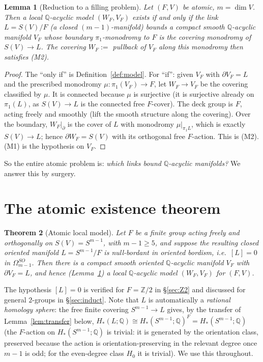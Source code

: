 \documentclass[12pt]{article}
\newtheorem{theorem}{Theorem}
\newtheorem{lemma}[theorem]{Lemma}
\theoremstyle{definition}
\begin{document}
\begin{lemma}[Reduction to a filling problem]\label{lem:reduce}
Let $(F,V)$ be atomic, $m=\dim V$. Then a local $\mathbb{Q}$-acyclic model
$(W_F,V_F)$ exists if and only if the link $L=S(V)/F$ (a closed
$(m-1)$-manifold) bounds a compact smooth $\mathbb{Q}$-acyclic manifold $V_F$
whose boundary $\pi_1$-monodromy to $F$ is the covering monodromy of
$S(V)\to L$. The covering $W_F:=$ pullback of $V_F$ along this monodromy then
satisfies (M2).
\end{lemma}
\begin{proof}
The ``only if'' is Definition~\ref{def:model}. For ``if'': given $V_F$ with
$\partial V_F=L$ and the prescribed monodromy $\mu\colon\pi_1(V_F)\to F$,
let $W_F\to V_F$ be the covering classified by $\mu$. It is connected because
$\mu$ is surjective (it is surjective already on $\pi_1(L)$, as
$S(V)\to L$ is the connected free $F$-cover). The deck group is $F$, acting
freely and smoothly (lift the smooth structure along the covering). Over the
boundary, $W_F|_{\partial}$ is the cover of $L$ with monodromy $\mu|_{\pi_1L}$,
which is exactly $S(V)\to L$; hence $\partial W_F=S(V)$ with its orthogonal free
$F$-action. This is (M2). (M1) is the hypothesis on $V_F$.
\end{proof}

So the entire atomic problem is: \emph{which links bound $\mathbb{Q}$-acyclic
manifolds?} We answer this by surgery.

\section{The atomic existence theorem}\label{sec:atomic}

\begin{theorem}[Atomic local model]\label{thm:atomic}
Let $F$ be a finite group acting freely and orthogonally on $S(V)=S^{m-1}$,
with $m-1\ge5$, and suppose the resulting closed oriented manifold
$L=S^{m-1}/F$ is null-bordant in oriented bordism, i.e.\ $[L]=0$ in
$\Omega^{SO}_{m-1}$. Then there is a compact smooth oriented $\mathbb{Q}$-acyclic
manifold $V_F$ with $\partial V_F=L$, and hence (Lemma~\ref{lem:reduce}) a
local $\mathbb{Q}$-acyclic model $(W_F,V_F)$ for $(F,V)$.
\end{theorem}

The hypothesis $[L]=0$ is verified for $F=\mathbb{Z}/2$ in
\S\ref{sec:Z2} and discussed for general $2$-groups in \S\ref{sec:induct}.
Note that $L$ is automatically a \emph{rational homology sphere}: the free
finite covering $S^{m-1}\to L$ gives, by the transfer of
Lemma~\ref{lem:transfer} below, $H_*(L;\mathbb{Q})\cong
H_*(S^{m-1};\mathbb{Q})^F=H_*(S^{m-1};\mathbb{Q})$ (the $F$-action on
$H_*(S^{m-1};\mathbb{Q})$ is trivial: it is generated by the orientation class,
preserved because the action is orientation-preserving in the relevant
degree once $m-1$ is odd; for the even-degree class $H_0$ it is trivial). We use
this throughout.
\end{document}
